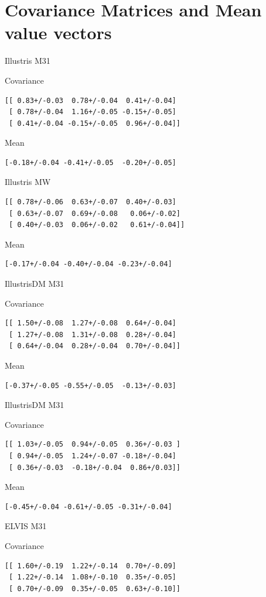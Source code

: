 \documentclass[a4paper,fleqn,usenatbib]{mnras}
\begin{document}
\section{Covariance Matrices and Mean value vectors}
Illustris M31

Covariance
\begin{verbatim}
[[ 0.83+/-0.03  0.78+/-0.04  0.41+/-0.04]
 [ 0.78+/-0.04  1.16+/-0.05 -0.15+/-0.05]
 [ 0.41+/-0.04 -0.15+/-0.05  0.96+/-0.04]]
\end{verbatim}

Mean

\begin{verbatim}
[-0.18+/-0.04 -0.41+/-0.05  -0.20+/-0.05]
\end{verbatim}

Illustris MW
\begin{verbatim}
[[ 0.78+/-0.06  0.63+/-0.07  0.40+/-0.03]
 [ 0.63+/-0.07  0.69+/-0.08   0.06+/-0.02]
 [ 0.40+/-0.03  0.06+/-0.02   0.61+/-0.04]]
\end{verbatim} 

Mean
\begin{verbatim}
[-0.17+/-0.04 -0.40+/-0.04 -0.23+/-0.04]
\end{verbatim}



IllustrisDM M31

Covariance
\begin{verbatim}
[[ 1.50+/-0.08  1.27+/-0.08  0.64+/-0.04]
 [ 1.27+/-0.08  1.31+/-0.08  0.28+/-0.04]
 [ 0.64+/-0.04  0.28+/-0.04  0.70+/-0.04]]
\end{verbatim}

Mean
\begin{verbatim}
[-0.37+/-0.05 -0.55+/-0.05  -0.13+/-0.03]
\end{verbatim}

IllustrisDM M31

Covariance
\begin{verbatim}
[[ 1.03+/-0.05  0.94+/-0.05  0.36+/-0.03 ]
 [ 0.94+/-0.05  1.24+/-0.07 -0.18+/-0.04]
 [ 0.36+/-0.03  -0.18+/-0.04  0.86+/0.03]]
\end{verbatim}

Mean
\begin{verbatim}
[-0.45+/-0.04 -0.61+/-0.05 -0.31+/-0.04]
\end{verbatim}

ELVIS M31

Covariance
\begin{verbatim}
[[ 1.60+/-0.19  1.22+/-0.14  0.70+/-0.09]
 [ 1.22+/-0.14  1.08+/-0.10  0.35+/-0.05]
 [ 0.70+/-0.09  0.35+/-0.05  0.63+/-0.10]]
\end{verbatim}
\end{document}
